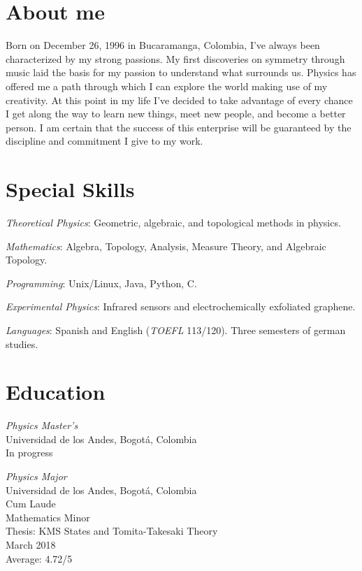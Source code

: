 \documentclass[line,margin]{res}
\begin{document}
\address{ivanmbur@gmail.com\\ Cr. 19 63 27, Bogotá, Colombia\\ (+57) 316 782 1110}

\begin{resume}

\section{About me}

Born on December 26, 1996 in Bucaramanga, Colombia, I've always been characterized by my strong passions. My first discoveries on symmetry through music laid the basis for my passion to understand what surrounds us. Physics has offered me a path through which I can explore the world making use of my creativity. At this point in my life I've decided to take advantage of every chance I get along the way to learn new things, meet new people, and become a better person. I am certain that the success of this enterprise will be guaranteed by the discipline and commitment I give to my work. 

\section{Special Skills}

{\sl Theoretical Physics}: Geometric, algebraic, and topological methods in physics.

{\sl Mathematics}: Algebra, Topology, Analysis, Measure Theory, and Algebraic Topology.

{\sl Programming}: Unix/Linux, Java, Python, C.

{\sl Experimental Physics}: Infrared sensors and electrochemically exfoliated graphene. 

{\sl Languages}: Spanish and English ({\sl TOEFL} 113/120). Three semesters of german studies.

\section{Education}

{\sl Physics Master's\\}
Universidad de los Andes, Bogotá, Colombia \\
In progress

{\sl Physics Major\\}
Universidad de los Andes, Bogotá, Colombia \\
Cum Laude \\
Mathematics Minor \\
Thesis: KMS States and Tomita-Takesaki Theory \\
March 2018 \\
Average: 4.72/5


\end{resume}
\end{document}

